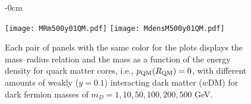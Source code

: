 \documentclass[universe,article,accept,moreauthors,pdftex]{Definitions/mdpi}
\begin{document}
\begin{figure}[H]\ContinuedFloat


\begin{adjustwidth}{-\extralength}{0cm}
\centering %

{\texttt{[image: MRm500y01QM.pdf]}\hspace{5pt}
	  \texttt{[image: MdensM500y01QM.pdf]}}
\end{adjustwidth}
\caption{Each pair of panels with the same color for the plots displays the mass--radius relation and the mass as a function of the energy density for quark matter cores, i.e., $p_{\rm QM}(R_{\rm QM})=0$, with different amounts of weakly ($y=0.1$) interacting dark matter ($w$DM) for dark fermion masses of $m_{D}=1,10,50,100,200,500$ GeV.}
\label{fig:MRdens01QM}

\end{figure}
  
\end{document}
